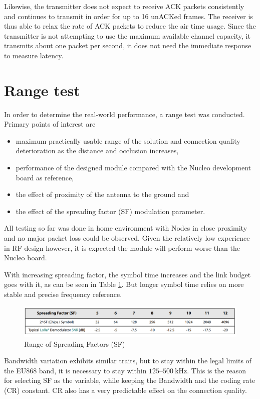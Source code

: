 Likewise, the transmitter does not expect to receive ACK packets consistently and continues to transmit in order for up to 16 unACKed frames. The receiver is thus able to relax the rate of ACK packets to reduce the air time usage. Since the transmitter is not attempting to use the maximum available channel capacity, it transmits about one packet per second, it does not need the immediate response to measure latency.

\section{Range test}
In order to determine the real-world performance, a range test was conducted. Primary points of interest are
\begin{itemize}
    \item maximum practically usable range of the solution and connection quality deterioration as the distance and occlusion increases,
    \item performance of the designed module compared with the Nucleo development board as reference,
    \item the effect of proximity of the antenna to the ground and
    \item the effect of the spreading factor (SF) modulation parameter.
\end{itemize}

All testing so far was done in home environment with Nodes in close proximity and no major packet loss could be observed. Given the relatively low experience in RF design however, it is expected the module will perform worse than the Nucleo board.

With increasing spreading factor, the symbol time increases and the link budget goes with it, as can be seen in Table \ref{table:semtech-sf}. But longer symbol time relies on more stable and precise frequency reference. 

\begin{figure}[H]
    \includegraphics[width=\textwidth]{fig/semtech-sf-table.png}
    \caption{\label{table:semtech-sf}Range of Spreading Factors (SF)}
\end{figure}

Bandwidth variation exhibits similar traits, but to stay within the legal limits of the EU868 band, it is necessary to stay within $125\text{--}500~\mathrm{kHz}$. This is the reason for selecting SF as the variable, while keeping the Bandwidth and the coding rate (CR) constant. CR also has a very predictable effect on the connection quality.

